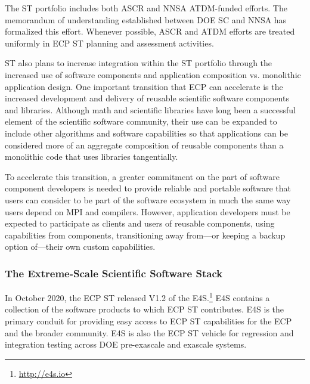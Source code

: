 The ST portfolio includes both ASCR and NNSA ATDM-funded efforts. The memorandum of understanding established between DOE SC and NNSA has formalized this effort.  Whenever possible, ASCR and ATDM efforts are treated uniformly in ECP ST planning and assessment activities.

ST also plans to increase integration within the ST portfolio through the increased use of software components and application composition vs. monolithic application design. One important transition that ECP can accelerate is the increased development and delivery of reusable scientific software components and libraries. Although math and scientific libraries have long been a successful element of the scientific software community, their use can be expanded to include other algorithms and software capabilities so that applications can be considered more of an aggregate composition of reusable components than a monolithic code that uses libraries tangentially.

To accelerate this transition, a greater commitment on the part of software component developers is needed to provide reliable and portable software that users can consider to be part of the software ecosystem in much the same way users depend on MPI and compilers. However, application developers must be expected to participate as clients and users of reusable components, using capabilities from components, transitioning away from---or keeping a backup option of---their own custom capabilities.

\subsubsection{The Extreme-Scale Scientific Software Stack}\label{subsubsect:e4s}
In October 2020, the ECP ST released V1.2 of the E4S.\footnote{\url{http://e4s.io}} E4S contains a collection of the software products to which ECP ST contributes.  E4S is the primary conduit for providing easy access to ECP ST capabilities for the ECP and the broader community.  E4S is also the ECP ST vehicle for regression and integration testing across DOE pre-exascale and exascale systems.

